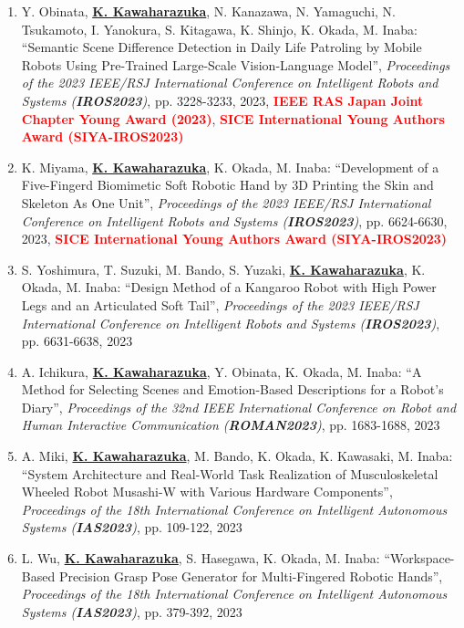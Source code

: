 \documentclass[letterpaper]{article}
\begin{document}
\begin{enumerate}
\item Y. Obinata, \underline{\textbf{K. Kawaharazuka}}, N. Kanazawa, N. Yamaguchi, N. Tsukamoto, I. Yanokura, S. Kitagawa, K. Shinjo, K. Okada, M. Inaba: ``Semantic Scene Difference Detection in Daily Life Patroling by Mobile Robots Using Pre-Trained Large-Scale Vision-Language Model'', \textit{Proceedings of the 2023 IEEE/RSJ International Conference on Intelligent Robots and Systems (\textit{\textbf{IROS2023}})}, pp. 3228-3233, 2023, \textbf{\textcolor{red}{IEEE RAS Japan Joint Chapter Young Award (2023)}}, \textbf{\textcolor{red}{SICE International Young Authors Award (SIYA-IROS2023)}}
\item K. Miyama, \underline{\textbf{K. Kawaharazuka}}, K. Okada, M. Inaba: ``Development of a Five-Fingerd Biomimetic Soft Robotic Hand by 3D Printing the Skin and Skeleton As One Unit'', \textit{Proceedings of the 2023 IEEE/RSJ International Conference on Intelligent Robots and Systems (\textit{\textbf{IROS2023}})}, pp. 6624-6630, 2023, \textbf{\textcolor{red}{SICE International Young Authors Award (SIYA-IROS2023)}}
\item S. Yoshimura, T. Suzuki, M. Bando, S. Yuzaki, \underline{\textbf{K. Kawaharazuka}}, K. Okada, M. Inaba: ``Design Method of a Kangaroo Robot with High Power Legs and an Articulated Soft Tail'', \textit{Proceedings of the 2023 IEEE/RSJ International Conference on Intelligent Robots and Systems (\textit{\textbf{IROS2023}})}, pp. 6631-6638, 2023
\item A. Ichikura, \underline{\textbf{K. Kawaharazuka}}, Y. Obinata, K. Okada, M. Inaba: ``A Method for Selecting Scenes and Emotion-Based Descriptions for a Robot's Diary'', \textit{Proceedings of the 32nd IEEE International Conference on Robot and Human Interactive Communication (\textit{\textbf{ROMAN2023}})}, pp. 1683-1688, 2023
\item A. Miki, \underline{\textbf{K. Kawaharazuka}}, M. Bando, K. Okada, K. Kawasaki, M. Inaba: ``System Architecture and Real-World Task Realization of Musculoskeletal Wheeled Robot Musashi-W with Various Hardware Components'', \textit{Proceedings of the 18th International Conference on Intelligent Autonomous Systems (\textit{\textbf{IAS2023}})}, pp. 109-122, 2023
\item L. Wu, \underline{\textbf{K. Kawaharazuka}}, S. Hasegawa, K. Okada, M. Inaba: ``Workspace-Based Precision Grasp Pose Generator for Multi-Fingered Robotic Hands'', \textit{Proceedings of the 18th International Conference on Intelligent Autonomous Systems (\textit{\textbf{IAS2023}})}, pp. 379-392, 2023

\end{enumerate}
\end{document}
